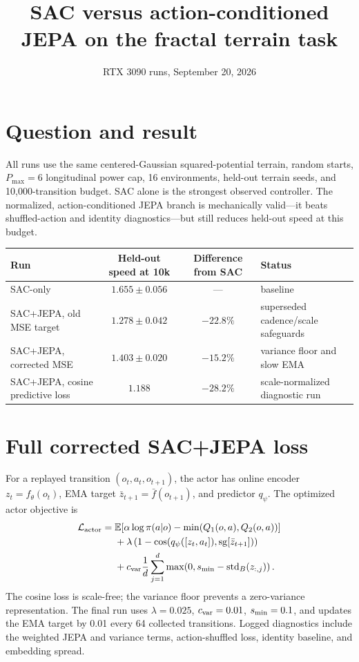 \documentclass[10pt]{article}
\title{SAC versus action-conditioned JEPA on the fractal terrain task}
\author{}
\date{RTX 3090 runs, September 20, 2026}
\begin{document}
\maketitle

\section*{Question and result}
All runs use the same centered-Gaussian squared-potential terrain, random
starts, $P_{\max}=6$ longitudinal power cap, 16 environments, held-out terrain
seeds, and 10,000-transition budget. SAC alone is the strongest observed
controller. The normalized, action-conditioned JEPA branch is mechanically
valid---it beats shuffled-action and identity diagnostics---but still reduces
held-out speed at this budget.

\begin{center}
\small
\begin{tabular}{p{1.6in}ccp{2.0in}}
\toprule
Run & Held-out speed at 10k & Difference from SAC & Status \\
\midrule
SAC-only & $1.655\pm0.056$ & --- & baseline \\
SAC+JEPA, old MSE target & $1.278\pm0.042$ & $-22.8\%$ & superseded cadence/scale safeguards \\
SAC+JEPA, corrected MSE & $1.403\pm0.020$ & $-15.2\%$ & variance floor and slow EMA \\
SAC+JEPA, cosine predictive loss & $1.188$ & $-28.2\%$ & scale-normalized diagnostic run \\
\bottomrule
\end{tabular}
\end{center}

\section*{Full corrected SAC+JEPA loss}
For a replayed transition $(o_t,a_t,o_{t+1})$, the actor has online encoder
$z_t=f_\theta(o_t)$, EMA target $\bar z_{t+1}=\bar f(o_{t+1})$, and predictor
$q_\psi$. The optimized actor objective is
\begin{equation}
\begin{aligned}
\mathcal L_{\rm actor}={}&\mathbb E\!\left[\alpha\log\pi(a|o)-\min(Q_1(o,a),Q_2(o,a))\right]\\
&+\lambda\left(1-\cos\!\left(q_\psi([z_t,a_t]),\operatorname{sg}[\bar z_{t+1}]\right)\right)\\
&+c_{\rm var}\frac{1}{d}\sum_{j=1}^d\max\!\left(0,s_{\rm min}-\operatorname{std}_B(z_{:,j})\right).
\end{aligned}
\end{equation}
The cosine loss is scale-free; the variance floor prevents a zero-variance
representation. The final run uses $\lambda=0.025$, $c_{\rm var}=0.01$,
$s_{\rm min}=0.1$, and updates the EMA target by 0.01 every 64 collected
transitions. Logged diagnostics include the weighted JEPA and variance terms,
action-shuffled loss, identity baseline, and embedding spread.
\end{document}
